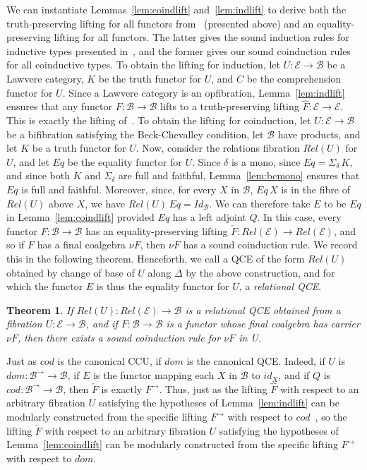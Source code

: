 \documentclass{LMCS}
\newcommand{\ra}{\rightarrow}
\newcommand\E{{\mathcal E}}
\newcommand\B{{\mathcal B}}
\theoremstyle{plain}
\newtheorem{theorem}{Theorem}[section]
\theoremstyle{remark}
\theoremstyle{definition}
\begin{document}
We can instantiate Lemmas~\ref{lem:coindlift} and~\ref{lem:indlift} to
derive both the truth-preserving lifting for all functors
from~\cite{gjf10} (presented above) and an equality-preserving lifting
for all functors. The latter gives the sound induction rules for
inductive types presented in~\cite{gjf10}, and the former gives our
sound coinduction rules for all coinductive types. To obtain the
lifting for induction, let $U:\E \ra \B$ be a Lawvere category, $K$ be
the truth functor for $U$, and $C$ be the comprehension functor for
$U$. Since a Lawvere category is an opfibration,
Lemma~\ref{lem:indlift} ensures that any functor $F:\B \ra \B$ lifts
to a truth-preserving lifting $\hat{F}:\E \ra \E$. This is exactly the
lifting of~\cite{gjf10}. To obtain the lifting for coinduction, let
$U:\E \ra \B$ be a bifibration satisfying the Beck-Chevalley
condition, let $\B$ have products, and let $K$ be a truth functor for
$U$. Now, consider the relations fibration $Rel(U)$ for $U$, and let
$Eq$ be the equality functor for $U$. Since $\delta$ is a mono, since
$Eq = \Sigma_{\delta}\, K$, and since both $K$ and $\Sigma_{\delta}$
are full and faithful, Lemma~\ref{lem:bcmono} ensures that $Eq$ is
full and faithful. Moreover, since, for every $X$ in $\B$, $Eq \,X$ is
in the fibre of $Rel(U)$ above $X$, we have $Rel(U)\, Eq =
\mathit{Id}_{\B}$. We can therefore take $E$ to be $Eq$ in
Lemma~\ref{lem:coindlift} provided $Eq$ has a left adjoint $Q$.  In
this case, every functor $F:\B \ra \B$ has an equality-preserving
lifting $\check{F}:Rel(\E) \ra Rel(\E)$, and so if $F$ has a final
coalgebra $\nu F$, then $\nu F$ has a sound coinduction rule. We
record this in the following theorem. Henceforth, we call a QCE of the
form $Rel(U)$ obtained by change of base of $U$ along $\Delta$ by the
above construction, and for which the functor $E$ is thus the equality
functor for $U$, a {\em relational QCE}.

\begin{theorem}\label{thm:coinda}
If $Rel(U): Rel(\E) \to \B $ is a relational QCE obtained from a
fibration $U:\E \ra \B$, and if $F : \B \to \B$ is a functor whose
final coalgebra has carrier $\nu F$, then there exists a sound
coinduction rule for $\nu F$ in U.
\end{theorem}

Just as $\mathit{cod}$ is the canonical CCU, if $\mathit{dom}$ is the
canonical QCE. Indeed, if $U$ is $\mathit{dom} : \B^\to \to \B$, if
$E$ is the functor mapping each $X$ in $\B$ to $\mathit{id}_X$, and if
$Q$ is $\mathit{cod} : \B^\to \to \B$, then $\check F$ is exactly
$F^\ra$. Thus, just as the lifting $\hat{F}$ with respect to an
arbitrary fibration $U$ satisfying the hypotheses of
Lemma~\ref{lem:indlift} can be modularly constructed from the specific
lifting $F^\to$ with respect to $\mathit{cod}$~\cite{gjf10}, so the
lifting $\check{F}$ with respect to an arbitrary fibration $U$
satisfying the hypotheses of Lemma~\ref{lem:coindlift} can be
modularly constructed from the specific lifting $F^\to$ with respect
to $\mathit{dom}$.
\end{document}
